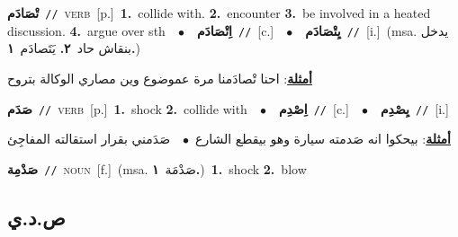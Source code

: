 \documentclass[10pt,a4paper,twoside]{article} %
\begin{document}
\begin{multicols}{2}
{\setlength\topsep{0pt}\textbf{\foreignlanguage{arabic}{تْصَادَم}}\ {\color{gray}\texttt{//}\color{black}}\ \textsc{verb}\ [p.]\ \textbf{1.}~collide with.  \textbf{2.}~encounter  \textbf{3.}~be involved in a heated discussion.  \textbf{4.}~argue over sth\ \ $\bullet$\ \ \setlength\topsep{0pt}\textbf{\foreignlanguage{arabic}{اِتْصَادَم}}\ {\color{gray}\texttt{//}\color{black}}\ [c.]\ \ $\bullet$\ \ \setlength\topsep{0pt}\textbf{\foreignlanguage{arabic}{يِتْصَادَم}}\ {\color{gray}\texttt{//}\color{black}}\ [i.]\ \color{gray}(msa. \foreignlanguage{arabic}{يدخل بنقاش حاد}~\foreignlanguage{arabic}{\textbf{٢.}}  \foreignlanguage{arabic}{يَتَصادَم}~\foreignlanguage{arabic}{\textbf{١.}})\color{black}\  \begin{flushright}\color{gray}\foreignlanguage{arabic}{\textbf{\underline{\foreignlanguage{arabic}{أمثلة}}}: احنا تْصادَمنا مرة عموضوع وين مصاري الوكالة بتروح}\end{flushright}\color{black}} \vspace{2mm}

{\setlength\topsep{0pt}\textbf{\foreignlanguage{arabic}{صَدَم}}\ {\color{gray}\texttt{//}\color{black}}\ \textsc{verb}\ [p.]\ \textbf{1.}~shock  \textbf{2.}~collide with\ \ $\bullet$\ \ \setlength\topsep{0pt}\textbf{\foreignlanguage{arabic}{اِصْدِم}}\ {\color{gray}\texttt{//}\color{black}}\ [c.]\ \ $\bullet$\ \ \setlength\topsep{0pt}\textbf{\foreignlanguage{arabic}{يِصْدِم}}\ {\color{gray}\texttt{//}\color{black}}\ [i.]\  \begin{flushright}\color{gray}\foreignlanguage{arabic}{\textbf{\underline{\foreignlanguage{arabic}{أمثلة}}}: بيحكوا انه صَدمته سيارة وهو بيقطع الشارع\ $\bullet$\ \  صَدَمني بقرار استقالته المفاجِئ}\end{flushright}\color{black}} \vspace{2mm}

{\setlength\topsep{0pt}\textbf{\foreignlanguage{arabic}{صَدْمِة}}\ {\color{gray}\texttt{//}\color{black}}\ \textsc{noun}\ [f.]\ \color{gray}(msa. \foreignlanguage{arabic}{صَدْمَة}~\foreignlanguage{arabic}{\textbf{١.}})\color{black}\ \textbf{1.}~shock  \textbf{2.}~blow\ } \vspace{2mm}

\vspace{-3mm}
\subsection*{\color{blue}\foreignlanguage{arabic}{ص.د.ي}\color{blue}{}} 


\end{multicols}
\end{document}
